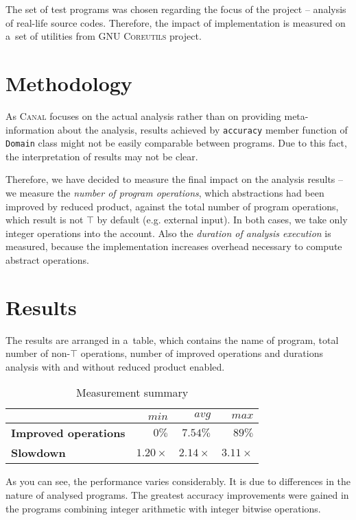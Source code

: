 \documentclass[12pt,oneside]{fithesis2}
\theoremstyle{definition}
\begin{document}
The set of test programs was chosen regarding the focus of the project -- analysis of real-life source codes. Therefore, the impact of implementation is measured on a~set of utilities from \textsc{GNU Coreutils} project.

\section{Methodology}

As \textsc{Canal} focuses on the actual analysis rather than on providing meta-information about the analysis, results achieved by \texttt{accuracy} member function of \texttt{Domain} class might not be easily comparable between programs. Due to this fact, the interpretation of results may not be clear.

Therefore, we have decided to measure the final impact on the analysis results -- we measure the \textit{number of program operations}, which abstractions had been improved by reduced product, against the total number of program operations, which result is not $\top$ by default (e.g. external input). In both cases, we take only integer operations into the account. Also the \textit{duration of analysis execution} is measured, because the implementation increases overhead necessary to compute abstract operations.

\section{Results}

The results are arranged in a~table, which contains the name of program, total number of non-$\top$ operations, number of improved operations and durations analysis with and without reduced product enabled.

\begin{table}
  \centering
  \begin{tabular}{l r r r}
     & $min$ & $avg$ & $max$ \\
     \midrule
    \textbf{Improved operations} & $0\%$ & $7.54\%$ & $89\%$\\
    \textbf{Slowdown} & $1.20\times$ & $2.14\times$ & $3.11\times$\\
  \end{tabular}
  \caption{Measurement summary}
\end{table}

As you can see, the performance varies considerably. It is due to differences in the nature of analysed programs. The greatest accuracy improvements were gained in the programs combining integer arithmetic with integer bitwise operations.
\end{document}
